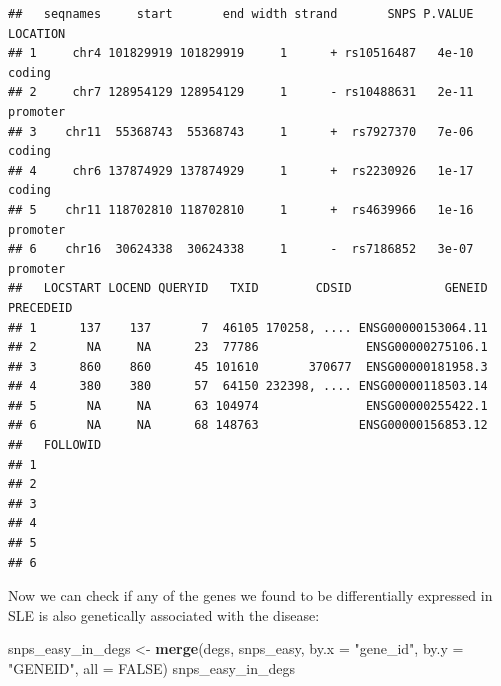 \documentclass[9pt,a4paper,]{extarticle}
\newenvironment{Shaded}{\begin{snugshade}}{\end{snugshade}}
\newcommand{\KeywordTok}[1]{\textcolor[rgb]{0.13,0.29,0.53}{\textbf{#1}}}
\newcommand{\DataTypeTok}[1]{\textcolor[rgb]{0.13,0.29,0.53}{#1}}
\newcommand{\StringTok}[1]{\textcolor[rgb]{0.31,0.60,0.02}{#1}}
\newcommand{\OtherTok}[1]{\textcolor[rgb]{0.56,0.35,0.01}{#1}}
\newcommand{\NormalTok}[1]{#1}
\begin{document}
\begin{verbatim}
##   seqnames     start       end width strand       SNPS P.VALUE LOCATION
## 1     chr4 101829919 101829919     1      + rs10516487   4e-10   coding
## 2     chr7 128954129 128954129     1      - rs10488631   2e-11 promoter
## 3    chr11  55368743  55368743     1      +  rs7927370   7e-06   coding
## 4     chr6 137874929 137874929     1      +  rs2230926   1e-17   coding
## 5    chr11 118702810 118702810     1      +  rs4639966   1e-16 promoter
## 6    chr16  30624338  30624338     1      -  rs7186852   3e-07 promoter
##   LOCSTART LOCEND QUERYID   TXID        CDSID             GENEID PRECEDEID
## 1      137    137       7  46105 170258, .... ENSG00000153064.11          
## 2       NA     NA      23  77786               ENSG00000275106.1          
## 3      860    860      45 101610       370677  ENSG00000181958.3          
## 4      380    380      57  64150 232398, .... ENSG00000118503.14          
## 5       NA     NA      63 104974               ENSG00000255422.1          
## 6       NA     NA      68 148763              ENSG00000156853.12          
##   FOLLOWID
## 1         
## 2         
## 3         
## 4         
## 5         
## 6
\end{verbatim}

Now we can check if any of the genes we found to be differentially expressed in SLE is also genetically associated with the disease:

\begin{Shaded}
\begin{Highlighting}[]
\NormalTok{snps_easy_in_degs <-}\StringTok{ }\KeywordTok{merge}\NormalTok{(degs, snps_easy, }\DataTypeTok{by.x =} \StringTok{"gene_id"}\NormalTok{, }\DataTypeTok{by.y =} \StringTok{"GENEID"}\NormalTok{, }\DataTypeTok{all =} \OtherTok{FALSE}\NormalTok{)}
\NormalTok{snps_easy_in_degs}
\end{Highlighting}
\end{Shaded}
\end{document}
